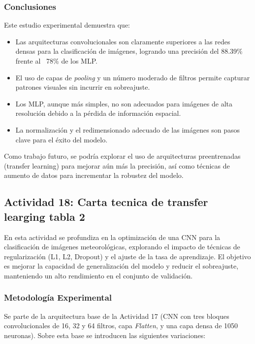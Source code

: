 \documentclass[12pt]{article}
\begin{document}
\subsubsection*{Conclusiones}

Este estudio experimental demuestra que:

\begin{itemize}
    \item Las arquitecturas convolucionales son claramente superiores a las redes densas para la clasificación de imágenes, logrando una precisión del 88.39\% frente al ~78\% de los MLP.
    \item El uso de capas de \textit{pooling} y un número moderado de filtros permite capturar patrones visuales sin incurrir en sobreajuste.
    \item Los MLP, aunque más simples, no son adecuados para imágenes de alta resolución debido a la pérdida de información espacial.
    \item La normalización y el redimensionado adecuado de las imágenes son pasos clave para el éxito del modelo.
\end{itemize}

Como trabajo futuro, se podría explorar el uso de arquitecturas preentrenadas (transfer learning) para mejorar aún más la precisión, así como técnicas de aumento de datos para incrementar la robustez del modelo.

\subsection{Actividad 18: Carta tecnica de transfer learging tabla 2}

En esta actividad se profundiza en la optimización de una CNN para la clasificación de imágenes meteorológicas, explorando el impacto de técnicas de regularización (L1, L2, Dropout) y el ajuste de la tasa de aprendizaje. El objetivo es mejorar la capacidad de generalización del modelo y reducir el sobreajuste, manteniendo un alto rendimiento en el conjunto de validación.

\subsubsection*{Metodología Experimental}

Se parte de la arquitectura base de la Actividad 17 (CNN con tres bloques convolucionales de 16, 32 y 64 filtros, capa \textit{Flatten}, y una capa densa de 1050 neuronas). Sobre esta base se introducen las siguientes variaciones:
\end{document}
